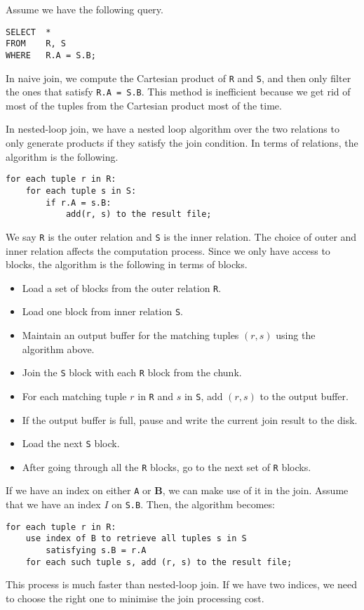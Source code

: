 \documentclass[a4paper, openany]{memoir}
\theoremstyle{definition}
\theoremstyle{plain}
\begin{document}
Assume we have the following query.
\begin{verbatim}
SELECT  *
FROM    R, S
WHERE   R.A = S.B;
\end{verbatim}
In naive join, we compute the Cartesian product of \texttt{R} and \texttt{S}, and then only filter the ones that satisfy \texttt{R.A = S.B}. This method is inefficient because we get rid of most of the tuples from the Cartesian product most of the time.

In nested-loop join, we have a nested loop algorithm over the two relations to only generate products if they satisfy the join condition. In terms of relations, the algorithm is the following.
\begin{verbatim}
for each tuple r in R:
    for each tuple s in S:
        if r.A = s.B:
            add(r, s) to the result file;
\end{verbatim}
We say \texttt{R} is the outer relation and \texttt{S} is the inner relation. The choice of outer and inner relation affects the computation process. Since we only have access to blocks, the algorithm is the following in terms of blocks.
\begin{itemize}
    \item Load a set of blocks from the outer relation \texttt{R}.
    \item Load one block from inner relation \texttt{S}.
    \item Maintain an output buffer for the matching tuples $(r, s)$ using the algorithm above.
    \item Join the \texttt{S} block with each \texttt{R} block from the chunk.
    \item For each matching tuple $r$ in \texttt{R} and $s$ in \texttt{S}, add $(r, s)$ to the output buffer.
    \item If the output buffer is full, pause and write the current join result to the disk.
    \item Load the next \texttt{S} block.
    \item After going through all the \texttt{R} blocks, go to the next set of \texttt{R} blocks.
\end{itemize}

If we have an index on either \texttt{A} or \textbf{B}, we can make use of it in the join. Assume that we have an index $I$ on \texttt{S.B}. Then, the algorithm becomes:
\begin{verbatim}
for each tuple r in R:
    use index of B to retrieve all tuples s in S 
        satisfying s.B = r.A
    for each such tuple s, add (r, s) to the result file;
\end{verbatim} 
This process is much faster than nested-loop join. If we have two indices, we need to choose the right one to minimise the join processing cost.
\end{document}
